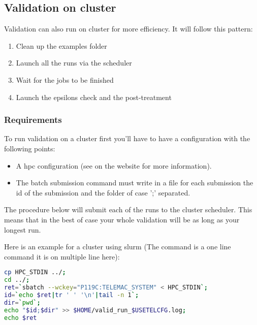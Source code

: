 \subsection{Validation on cluster}

Validation can also run on cluster for more efficiency.
It will follow this pattern:
\begin{enumerate}
  \item Clean up the examples folder
  \item Launch all the \telma runs via the scheduler
  \item Wait for the jobs to be finished
  \item Launch the epsilons check and the post-treatment
\end{enumerate}

\subsubsection{Requirements}

To run validation on a cluster first you'll have to have a configuration with
the following points:
\begin{itemize}
  \item A hpc configuration (see on the website for more information).
  \item The batch submission command must write in a file for each submission
    the id of the submission and the folder of case ';' separated.
\end{itemize}

The procedure below will submit each of the \telma{} runs to the cluster
scheduler. This means that in the best of case your whole validation will be as
long as your longest \telma{} run.

Here is an example for a cluster using slurm (The command is a one line command
it is on multiple line here):
\begin{lstlisting}[language=bash]
cp HPC_STDIN ../;
cd ../;
ret=`sbatch --wckey="P119C:TELEMAC_SYSTEM" < HPC_STDIN`;
id=`echo $ret|tr ' ' '\n'|tail -n 1`;
dir=`pwd`;
echo "$id;$dir" >> $HOME/valid_run_$USETELCFG.log;
echo $ret
\end{lstlisting}

